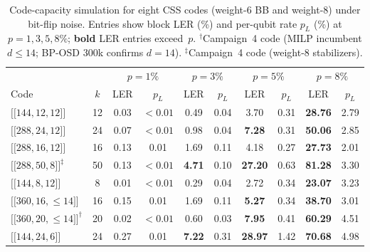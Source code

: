 \documentclass[aps,prxquantum,twocolumn,superscriptaddress,nofootinbib]{revtex4-2}
\newcommand{\dblbrk}[1]{\ensuremath{\lbrack\!\lbrack #1 \rbrack\!\rbrack}}
\newcommand{\code}[1]{\dblbrk{#1}}
\begin{document}
\begin{table}[t]
\centering
\caption{Code-capacity simulation for eight CSS codes (weight-6 BB and weight-8) under bit-flip noise.
Entries show block LER (\%) and per-qubit rate $p_L$ (\%) at $p = 1, 3, 5, 8\%$; \textbf{bold} LER entries exceed~$p$.
$^{\dagger}$Campaign~4 code (MILP incumbent $d \leq 14$; BP-OSD 300k confirms $d = 14$).
$^{\ddagger}$Campaign~4 code (weight-8 stabilizers).}
\label{tab:threshold_css}
\small
\begin{tabular}{l c | cc cc cc cc}
\toprule
& & \multicolumn{2}{c}{$p = 1\%$} & \multicolumn{2}{c}{$p = 3\%$} & \multicolumn{2}{c}{$p = 5\%$} & \multicolumn{2}{c}{$p = 8\%$} \\
Code & $k$ & LER & $p_L$ & LER & $p_L$ & LER & $p_L$ & LER & $p_L$ \\
\midrule
$\code{144,12,12}$~\cite{bravyi2024high} & 12 & 0.03 & ${<}0.01$ & 0.49 & 0.04 & 3.70 & 0.31 & \textbf{28.76} & 2.79 \\
$\code{288,24,12}$ & 24 & 0.07 & ${<}0.01$ & 0.98 & 0.04 & \textbf{7.28} & 0.31 & \textbf{50.06} & 2.85 \\
$\code{288,16,12}$ & 16 & 0.13 & 0.01 & 1.69 & 0.11 & 4.18 & 0.27 & \textbf{27.73} & 2.01 \\
$\code{288,50,8}^{\ddagger}$ & 50 & 0.13 & ${<}0.01$ & \textbf{4.71} & 0.10 & \textbf{27.20} & 0.63 & \textbf{81.28} & 3.30 \\
$\code{144,8,12}$ & 8 & 0.01 & ${<}0.01$ & 0.29 & 0.04 & 2.72 & 0.34 & \textbf{23.07} & 3.23 \\
$\code{360,16,{\leq}14}$ & 16 & 0.15 & 0.01 & 1.69 & 0.11 & \textbf{5.27} & 0.34 & \textbf{38.70} & 3.01 \\
$\code{360,20,{\leq}14}^\dagger$ & 20 & 0.02 & ${<}0.01$ & 0.60 & 0.03 & \textbf{7.95} & 0.41 & \textbf{60.29} & 4.51 \\
$\code{144,24,6}$ & 24 & 0.27 & 0.01 & \textbf{7.22} & 0.31 & \textbf{28.97} & 1.42 & \textbf{70.68} & 4.98 \\
\bottomrule
\end{tabular}
\end{table}
\end{document}
